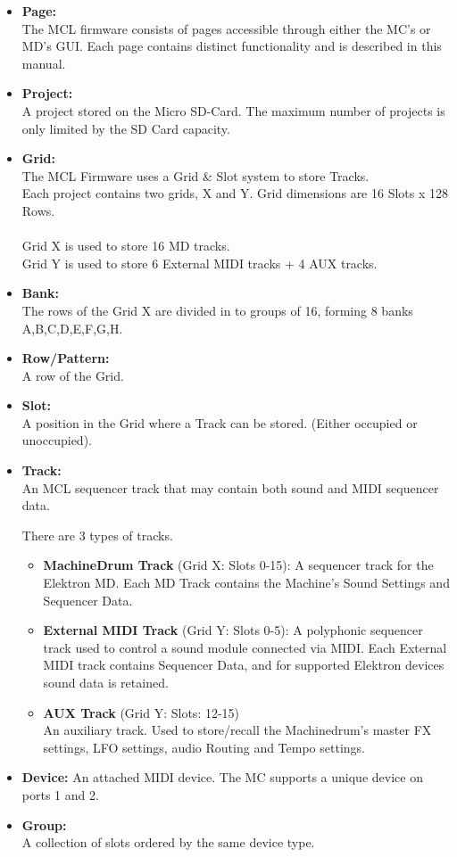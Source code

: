 \begin{itemize}
\item \textbf{Page:}
\\
The MCL firmware consists of pages accessible through either the MC's or MD's GUI. Each page contains distinct functionality and is described in this manual.
\item \textbf{Project:}
\\
A project stored on the Micro SD-Card.
The maximum number of projects is only limited by the SD Card capacity.

\item \textbf{Grid:}
\\
The MCL Firmware uses a Grid \& Slot system to store Tracks.\\
Each project contains two grids, X and Y. Grid dimensions are 16 Slots x 128 Rows.\\
\\
Grid X is used to store 16 MD tracks.\\Grid Y is used to store 6 External MIDI tracks + 4 AUX tracks.
\item \textbf{Bank:}\\
The rows of the Grid X are divided in to groups of 16, forming 8 banks A,B,C,D,E,F,G,H.
\item \textbf{Row/Pattern:}
\\
A row of the Grid.

\item \textbf{Slot:}
\\
A position in the Grid where a Track can be stored. (Either occupied or unoccupied).
\item \textbf{Track:}
\\
An MCL sequencer track that may contain both sound and MIDI sequencer data.

There are 3 types of tracks.
\begin{itemize}

\item \textbf{MachineDrum Track} (Grid X: Slots 0-15):
A sequencer track for the Elektron MD. Each MD Track contains the Machine's Sound Settings and Sequencer Data.

\item \textbf{External MIDI Track} (Grid Y: Slots 0-5):
A polyphonic sequencer track used to control a sound module connected via MIDI. Each External MIDI track contains Sequencer Data, and for supported Elektron devices sound data is retained. 

\item \textbf{AUX Track} (Grid Y: Slots: 12-15)\\
An auxiliary track. Used to store/recall the Machinedrum's master FX settings, LFO settings, audio Routing and Tempo settings.
\end{itemize}

\item \textbf{Device:}
An attached MIDI device. The MC supports a unique device on ports 1 and 2.

\item \textbf{Group:}
\\
A collection of slots ordered by the same device type.

\end{itemize}